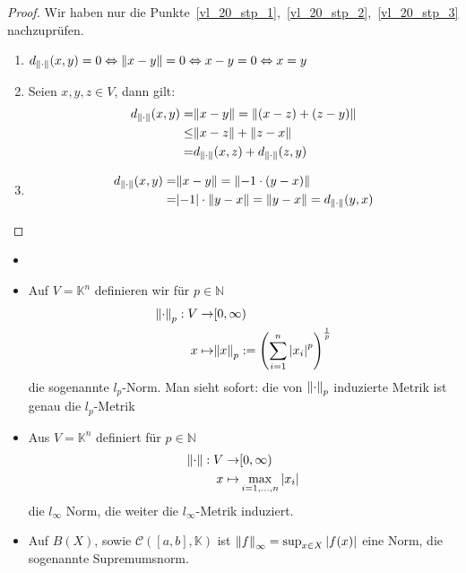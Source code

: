 \begin{proof}
	Wir haben nur die Punkte~\ref{vl_20_stp_1},~\ref{vl_20_stp_2},~\ref{vl_20_stp_3} nachzuprüfen.
	\begin{enumerate}
		\item $
			d_{\norm{\cdot}}(x,y) = 0 \Leftrightarrow \norm{x-y} = 0		
			\Leftrightarrow  x-y = 0 
			\Leftrightarrow x = y
		$
		\item Seien $x,y,z \in V$, dann gilt:
		\begin{align*}
			d_{\norm{\cdot}}(x,y) = & \norm{x-y} = \norm{(x-z)+(z-y)} \\
			\leq & \norm{x-z} + \norm{z-x} \\
			= & d_{\norm{\cdot}}(x,z) + d_{\norm{\cdot}}(z,y)	
		\end{align*}
		\item 
		\begin{align*}
			d_{\norm{\cdot}}(x,y) = & \norm{x-y} = \norm{-1 \cdot (y-x)} \\
			=& \abs{-1} \cdot \norm{y-x} = \norm{y-x} = d_{\norm{\cdot}}(y,x)
		\end{align*}
	\end{enumerate}
\end{proof}

\begin{Beispiel}{
	\begin{itemize}
		\item[]
		\item Auf $V = \mathbb{K}^n$ definieren wir für $p \in \mathbb{N}$
		\begin{align*}
			\norm{\cdot}_p : V \rightarrow & [0, \infty) \\
				x \mapsto &\norm{x}_p := \left( \sum_{i=1}^n \abs{x_i}^p \right)^{\frac{1}{p}}
		\end{align*}
		die sogenannte $l_p$-Norm.
		Man sieht sofort: die von $\norm{\cdot}_p$ induzierte Metrik ist genau die 
		$l_p$-Metrik
		\item Aus  $V = \mathbb{K}^n$ definiert für $p \in \mathbb{N}$ 
		\begin{align*}
			\norm{\cdot}: V \rightarrow & [0, \infty)  \\
			x \mapsto & \max_{i = 1, \hdots, n} \abs{x_i}
		\end{align*}
		die $l_\infty$ Norm, die weiter die $l_\infty$-Metrik induziert.
		\item Auf $B(X)$, sowie $\mathcal{C}([a,b], \mathbb{K})$ ist
		$\norm{f}_\infty = \sup_{x \in X} \abs{f(x)}$ eine Norm, die sogenannte 
		Supremumsnorm.
	\end{itemize}
}\end{Beispiel}

